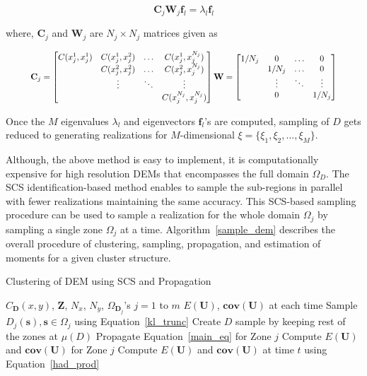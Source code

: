 \begin{equation}
\textbf{C}_j\textbf{W}_j \textbf{f}_l = \lambda_l \textbf{f}_l
\end{equation}

\noindent where, $\textbf{C}_j$ and $\textbf{W}_j$ are $N_j \times N_j$ matrices given as


\begin{equation}
\label{cov_mat}
\resizebox{0.9\textwidth}{!}{%
$\textbf{C}_j = \begin{bmatrix}
C(x_j^{1},x_j^{1}) & C(x_j^{1},x_j^{2}) & \ldots & C(x_j^{1},x_j^{N_j}) \\
 & C(x_j^{2},x_j^{2}) & \ldots & C(x_j^{2},x_j^{N_j}) \\
& \vdots & \ddots & \vdots \\
&  &  &   C(x_j^{N_j},x_j^{N_j})
\end{bmatrix}
\textbf{W} = \begin{bmatrix}
1/N_j & 0 & \ldots & 0 \\
& 1/N_j & \ldots & 0 \\
 & \vdots & \ddots & \vdots \\
 & 0 & & 1/N_j
\end{bmatrix}$}
\end{equation}

Once the $M$ eigenvalues $\lambda_l$ and eigenvectors $\textbf{f}_l$'s are computed, sampling of $D$ gets reduced to generating realizations for $M$-dimensional $\xi = \lbrace \xi_1,\xi_2,\ldots, \xi_M \rbrace$.

Although, the above method is easy to implement, it is computationally expensive for high resolution DEMs that encompasses the full domain $\Omega_{D}$. The SCS identification-based method enables to sample the sub-regions in parallel with fewer realizations maintaining the same accuracy. This SCS-based sampling procedure can be used to sample a realization for the whole domain $\Omega_j$ by sampling a single zone $\Omega_j$ at a time. Algorithm~\ref{sample_dem} describes the overall procedure of clustering, sampling, propagation, and estimation of moments for a given cluster structure.


\begin{algorithm}[H]
\caption{Clustering of DEM using SCS and Propagation}
\label{sample_dem}
\begin{algorithmic}
\Require $C_\textbf{D}(x,y)$, $\textbf{Z}$, $N_x$, $N_y$, $\Omega_{\textbf{D}_j}$'s $j = 1$ to $m$
\Ensure $E(\textbf{U})$, $\textbf{cov}(\textbf{U})$ at each time
\State Sample $D_j(\textbf{s}), \textbf{s} \in \Omega_j$ using Equation~\ref{kl_trunc}
\State Create $D$ sample by keeping rest of the zones at $\mu(D)$
\State Propagate Equation~\ref{main_eq} for Zone $j$
\State Compute $E(\textbf{U})$ and $\textbf{cov}(\textbf{U})$ for Zone $j$
\EndFor
\State Compute $E(\textbf{U})$ and $\textbf{cov}(\textbf{U})$ at time $t$ using Equation~\ref{had_prod}
\EndFor
\end{algorithmic}
\end{algorithm}

